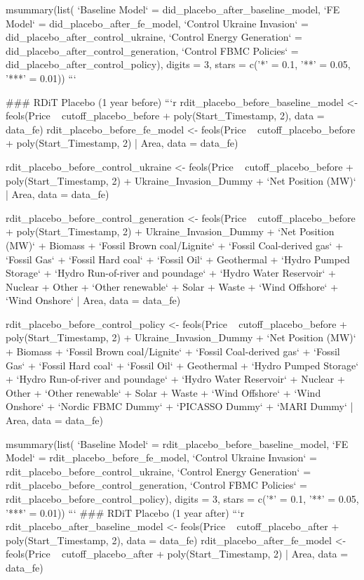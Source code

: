 msummary(list(
    `Baseline Model` = did_placebo_after_baseline_model,
    `FE Model` = did_placebo_after_fe_model,
    `Control Ukraine Invasion` = did_placebo_after_control_ukraine,
    `Control Energy Generation` = did_placebo_after_control_generation,
    `Control FBMC Policies` = did_placebo_after_control_policy),
  digits = 3,
  stars = c('*' = 0.1, '**' = 0.05, '***' = 0.01))
```

### RDiT Placebo (1 year before)
```{r}
rdit_placebo_before_baseline_model <- feols(Price ~ cutoff_placebo_before + poly(Start_Timestamp, 2), data = data_fe)
rdit_placebo_before_fe_model <- feols(Price ~ cutoff_placebo_before + poly(Start_Timestamp, 2) | Area, data = data_fe)

rdit_placebo_before_control_ukraine <- feols(Price ~ cutoff_placebo_before + poly(Start_Timestamp, 2) + Ukraine_Invasion_Dummy + `Net Position (MW)` | Area, data = data_fe)

rdit_placebo_before_control_generation <- feols(Price ~ cutoff_placebo_before + poly(Start_Timestamp, 2) + Ukraine_Invasion_Dummy + `Net Position (MW)` + Biomass + `Fossil Brown coal/Lignite` + `Fossil Coal-derived gas` + `Fossil Gas` + `Fossil Hard coal` + `Fossil Oil` + Geothermal + `Hydro Pumped Storage` + `Hydro Run-of-river and poundage` + `Hydro Water Reservoir` + Nuclear + Other + `Other renewable` + Solar + Waste + `Wind Offshore` + `Wind Onshore` | Area, data = data_fe)

rdit_placebo_before_control_policy <- feols(Price ~ cutoff_placebo_before + poly(Start_Timestamp, 2) + Ukraine_Invasion_Dummy + `Net Position (MW)` + Biomass + `Fossil Brown coal/Lignite` + `Fossil Coal-derived gas` + `Fossil Gas` + `Fossil Hard coal` + `Fossil Oil` + Geothermal + `Hydro Pumped Storage` + `Hydro Run-of-river and poundage` + `Hydro Water Reservoir` + Nuclear + Other + `Other renewable` + Solar + Waste + `Wind Offshore` + `Wind Onshore` + `Nordic FBMC Dummy` + `PICASSO Dummy` + `MARI Dummy` | Area, data = data_fe)

msummary(list(
    `Baseline Model` = rdit_placebo_before_baseline_model,
    `FE Model` = rdit_placebo_before_fe_model,
    `Control Ukraine Invasion` = rdit_placebo_before_control_ukraine,
    `Control Energy Generation` = rdit_placebo_before_control_generation,
    `Control FBMC Policies` = rdit_placebo_before_control_policy),
  digits = 3,
  stars = c('*' = 0.1, '**' = 0.05, '***' = 0.01))
```
### RDiT Placebo (1 year after)
```{r}
rdit_placebo_after_baseline_model <- feols(Price ~ cutoff_placebo_after + poly(Start_Timestamp, 2), data = data_fe)
rdit_placebo_after_fe_model <- feols(Price ~ cutoff_placebo_after + poly(Start_Timestamp, 2) | Area, data = data_fe)

